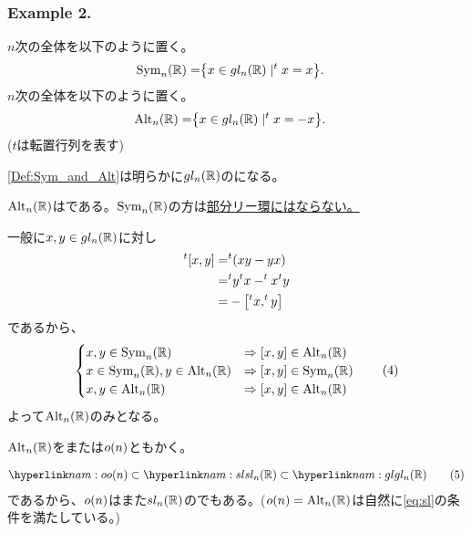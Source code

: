 \documentclass[../main]{subfiles}
\begin{document}
\subsubsection*{Example 2.}
\begin{definition}\label{Def:Sym_and_Alt}
  $n$次の全体を以下のように置く。
  \begin{align*}
    \operatorname{Sym}_{n}(\mathbb{R}) =& \qty{x\in gl_{n}(\mathbb{R})\mid ^{t}x=x}.
  \end{align*}
  $n$次の全体を以下のように置く。
  \begin{align*}
    \operatorname{Alt}_{n}(\mathbb{R}) =& \qty{x\in gl_{n}(\mathbb{R})\mid ^{t}x=-x}.
  \end{align*}
  ($t$は転置行列を表す)
\end{definition}
\begin{remark}
  \cref{Def:Sym_and_Alt}は明らかに$gl_{n}(\mathbb{R})$の{}になる。
\end{remark}
\begin{theorem}
  $\operatorname{Alt}_{n}(\mathbb{R})$は{}である。$\operatorname{Sym}_{n}(\mathbb{R})$の方は\underline{部分リー環にはならない。}
\end{theorem}
\begin{Proof}
  一般に$x,y\in gl_{n}(\mathbb{R})$に対し
  \begin{align*}
    ^{t}\comm{x}{y} =& ^{t}\qty(xy-yx)\\
    =& ^{t}y^{t}x-^t{x}^t{y}\\
    =& -\comm{^{t}x}{^{t}y}
  \end{align*}
  であるから、
  \begin{align*}
    \begin{cases}
      x,y\in\Sym_{n}(\R) &\Rightarrow \comm{x}{y}\in\Alt_{n}(\R)\\
      x\in\Sym_{n}(\R),y\in\Alt_{n}(\R) &\Rightarrow \comm{x}{y}\in\Sym_{n}(\R)\\
      x,y\in\Alt_{n}(\R) &\Rightarrow \comm{x}{y}\in\Alt_{n}(\R)
    \end{cases}
    \tag{4}\label{eq:2_(4)}
  \end{align*}
  よって$\operatorname{Alt}_{n}(\mathbb{R})$のみ{}となる。
\end{Proof}
\begin{named}
  $\operatorname{Alt}_{n}(\mathbb{R})$をまたは$o(n)$ともかく。
\end{named}
\begin{remark}
  \begin{align*}
    \hlin{nam:o}{\o(n)}\subset \hlin{nam:sl}{\sl_{n}(\R)} \subset \hlin{nam:gl}{\gl_{n}(\R)} \tag{5}\label{eq:2_(5)}
  \end{align*}
  であるから、$o(n)$はまた$sl_{n}(\mathbb{R})$の{}でもある。($o(n)=\operatorname{Alt}_{n}(\mathbb{R})$は自然に\eqref{eq:sl}の条件を満たしている。)
\end{remark}
\end{document}

